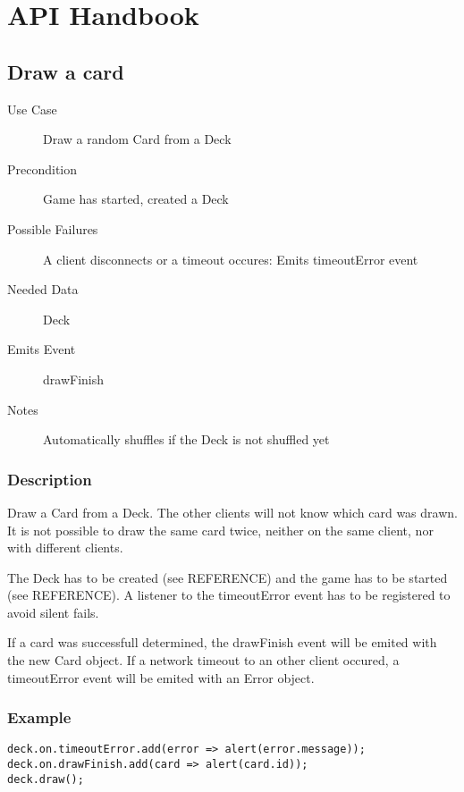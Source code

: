 \chapter{API Handbook}

\section{Draw a card}

\begin{description}
	\item[Use Case] Draw a random Card from a Deck
	\item[Precondition] Game has started, created a Deck
	\item[Possible Failures] A client disconnects or a timeout occures: Emits
	timeoutError event
	\item[Needed Data] Deck
	\item[Emits Event] drawFinish
	\item[Notes] Automatically shuffles if the Deck is not shuffled yet
\end{description}

\subsection{Description}

Draw a Card from a Deck. The other clients will not know which card was drawn.
It is not possible to draw the same card twice, neither on the same client, nor
with different clients.

The Deck has to be created (see REFERENCE) and the game has to be started (see
REFERENCE). A listener to the timeoutError event has to be registered to avoid
silent fails.

If a card was successfull determined, the drawFinish event will be emited with
the new Card object. If a network timeout to an other client occured, a
timeoutError event will be emited with an Error object.

\subsection{Example}

\begin{lstlisting}
deck.on.timeoutError.add(error => alert(error.message));
deck.on.drawFinish.add(card => alert(card.id));
deck.draw();
\end{lstlisting}